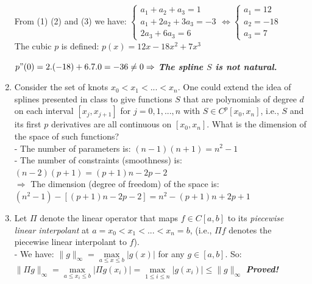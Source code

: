 \documentclass[14pt,a4paper]{article}
\begin{document}
\begin{enumerate}
	From (1) (2) and (3) we have: $\begin{cases} a_1 + a_2 + a_3 = 1 \\ a_1 + 2a_2 + 3a_3 = -3 \\ 2a_3 + 6a_3 = 6 \end{cases} \Leftrightarrow \begin{cases} a_1 = 12 \\ a_2 = -18 \\ a_3 = 7 \end{cases} $ \\
	The cubic $p$ is defined: \hspace{0.3cm} $p(x) = 12x - 18x^2 + 7x^3$
	
	$p"(0) = 2.(-18) + 6.7.0 = -36 \neq 0 \Rightarrow $ \textbf{\textit{The spline $S$ is not natural.}}
	
	\label{2b}	
	\item Consider the set of knots $x_0 < x_1 < ... < x_n$. One could extend the idea of splines presented in class to give functions $S$ that are polynomials of degree $d$ on each interval $[x_j,x_{j+1}]$ for $j = 0,1,...,n$ with $S \in C^p[x_0,x_n]$, i.e., $S$ and its first $p$ derivatives are all continuous on $[x_0,x_n]$. What is the dimension of the space of such functions?\\
	- The number of parameters is: $(n-1)(n+1) = n^2 -1$\\
	- The number of constraints (smoothness) is: $(n-2)(p+1) = (p+1)n - 2p - 2$\\
	$\Rightarrow$ The dimension (degree of freedom) of the space is:\\
	\hspace*{3cm} $(n^2 -1) - [(p+1)n -2p -2] = n^2 - (p+1)n +2p +1$
	\label{2c}
	\item Let $\Pi$ denote the linear operator that maps $f \in C[a,b]$ to its \textit{piecewise linear interpolant} at $a = x_0 < x_1 < ... < x_n = b$, (i.e., $\Pi f$ denotes the piecewise linear interpolant to $f$).\\
	- We have: \hspace{0.3cm} $\|g\|_{\infty} = \max\limits_{a\leq x \leq b}|g(x)|$ for any $g \in [a,b]$. So: \\
	\hspace*{1.5cm} $\|\Pi g\|_{\infty} = \max\limits_{a \leq x_i \leq b} |\Pi g(x_i)| = \max\limits_{1 \leq i \leq n}|g(x_i)| \leq \|g\|_{\infty}$ \hspace{1.5cm} \textbf{\textit{Proved!}}\\

\end{enumerate}
\end{document}
